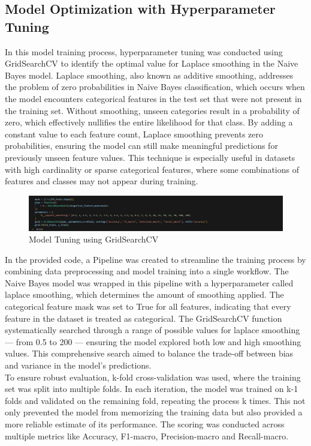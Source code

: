 \subsection{Model Optimization with Hyperparameter Tuning}
In this model training process, hyperparameter tuning was conducted using GridSearchCV to identify the optimal value for Laplace smoothing in the Naive Bayes model. Laplace smoothing, also known as additive smoothing, addresses the problem of zero probabilities in Naive Bayes classification, which occurs when the model encounters categorical features in the test set that were not present in the training set. Without smoothing, unseen categories result in a probability of zero, which effectively nullifies the entire likelihood for that class. By adding a constant value to each feature count, Laplace smoothing prevents zero probabilities, ensuring the model can still make meaningful predictions for previously unseen feature values. This technique is especially useful in datasets with high cardinality or sparse categorical features, where some combinations of features and classes may not appear during training.\\

\begin{figure}[hbt!]
    \centering
    \includegraphics[width=1\linewidth]{Images/6.6b.jpg}
    \caption{Model Tuning using GridSearchCV}
    \label{fig:enter-label}
\end{figure}

In the provided code, a Pipeline was created to streamline the training process by combining data preprocessing and model training into a single workflow. The Naive Bayes model was wrapped in this pipeline with a hyperparameter called laplace smoothing, which determines the amount of smoothing applied. The categorical feature mask was set to True for all features, indicating that every feature in the dataset is treated as categorical. The GridSearchCV function systematically searched through a range of possible values for laplace smoothing — from 0.5 to 200 — ensuring the model explored both low and high smoothing values. This comprehensive search aimed to balance the trade-off between bias and variance in the model's predictions.\\

To ensure robust evaluation, k-fold cross-validation was used, where the training set was split into multiple folds. In each iteration, the model was trained on k-1 folds and validated on the remaining fold, repeating the process k times. This not only prevented the model from memorizing the training data but also provided a more reliable estimate of its performance. The scoring was conducted across multiple metrics like Accuracy, F1-macro, Precision-macro and Recall-macro.\\

